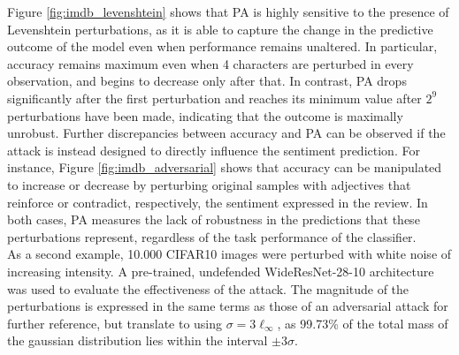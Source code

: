 Figure \ref{fig:imdb_levenshtein} shows that PA is highly sensitive to the
presence of Levenshtein perturbations, as it is able to capture the
change in the predictive outcome of the model even when performance remains 
unaltered. In particular, accuracy remains maximum even when 4 characters
are perturbed in every observation, and begins to decrease only after that. In contrast,
PA drops significantly after the first perturbation and reaches its minimum value
after $2^9$ perturbations have been made, indicating that the outcome is maximally
unrobust. Further discrepancies between accuracy and PA can be observed if the 
attack is instead designed to directly influence the sentiment prediction.
For instance, Figure \ref{fig:imdb_adversarial} shows that accuracy can be 
manipulated to increase or decrease by perturbing original samples with
adjectives that reinforce or contradict, respectively, 
the sentiment expressed in the review. In both cases, PA measures the lack of robustness in the
predictions that these perturbations represent, regardless of the task
performance of the classifier. \\

As a second example, 10.000 CIFAR10
\cite{krizhevskyLearningMultipleLayers}
images were perturbed with white noise of increasing intensity. 
A pre-trained, undefended WideResNet-28-10
\cite{BMVC2016_87}
architecture was used to evaluate the effectiveness of the attack. The 
magnitude of the perturbations is expressed in the same terms as those of an adversarial 
attack for further 
reference, but translate to using $\sigma = 3 \ell_\infty$, as 99.73\% of the
total mass of the gaussian distribution lies within the interval $\pm 3\sigma$.

